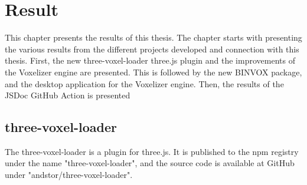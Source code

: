 \chapter{Result}
This chapter presents the results of this thesis. The chapter starts with presenting the various results from the different projects developed and connection with this thesis. First, the new three-voxel-loader three.js plugin and the improvements of the Voxelizer engine are presented. This is followed by the new BINVOX package, and the desktop application for the Voxelizer engine. Then, the results of the JSDoc GitHub Action is presented

\section{three-voxel-loader}
The three-voxel-loader is a plugin for three.js. It is published to the npm registry under the name "three-voxel-loader", and the source code is available at GitHub under "andstor/three-voxel-loader".

